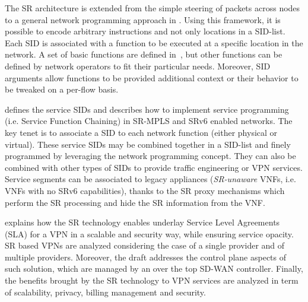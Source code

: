 The SR architecture is extended from the simple steering of packets across nodes to a general network programming approach in \cite{id-srv6-network-prog}. Using this framework, it is possible to encode arbitrary instructions and not only locations in a SID-list. Each SID is associated with a function to be executed at a specific location in the network. A set of basic functions are defined in~\cite{id-srv6-network-prog}, but other functions can be defined by network operators to fit their particular needs. Moreover, SID arguments allow functions to be provided additional context or their behavior to be tweaked on a per-flow basis.

\cite{id-sr-service-programming} defines the service SIDs and describes how to implement service programming (i.e. Service Function Chaining) in SR-MPLS and SRv6 enabled networks. The key tenet is to associate a SID to each network function (either physical or virtual). These service SIDs may be combined together in a SID-list and finely programmed by leveraging the network programming concept. They can also be combined with other types of SIDs to provide traffic engineering or VPN services. Service segments can be associated to legacy appliances (\textit{SR-unaware} VNFs, i.e. VNFs with no SRv6 capabilities), thanks to the SR proxy mechanisms which perform the SR processing and hide the SR information from the VNF.

\cite{id-sr-for-sdwan} explains how the SR technology enables underlay Service Level Agreements (SLA) for a VPN in a scalable and security way, while ensuring service opacity. SR based VPNs are analyzed considering the case of a single provider and of multiple providers. Moreover, the draft addresses the control plane aspects of such solution, which are managed by an over the top SD-WAN controller. Finally, the benefits brought by the SR technology to VPN services are analyzed in term of scalability, privacy, billing management and security.

